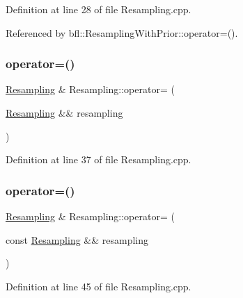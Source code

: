 Definition at line 28 of file Resampling.\+cpp.



Referenced by bfl\+::\+Resampling\+With\+Prior\+::operator=().

\mbox{\label{classbfl_1_1Resampling_a2c90a9a0705770bad5761a04fefe6eaa}} 
\subsubsection{\texorpdfstring{operator=()}{operator=()}\hspace{0.1cm}{\footnotesize\ttfamily [2/3]}}
{\footnotesize\ttfamily \mbox{\hyperlink{classbfl_1_1Resampling}{Resampling}} \& Resampling\+::operator= (\begin{DoxyParamCaption}\item[{\mbox{\hyperlink{classbfl_1_1Resampling}{Resampling}} \&\&}]{resampling }\end{DoxyParamCaption})\hspace{0.3cm}{\ttfamily [noexcept]}}



Definition at line 37 of file Resampling.\+cpp.

\mbox{\label{classbfl_1_1Resampling_a2120e8c5d26276cd3432ac23a2ada859}} 
\subsubsection{\texorpdfstring{operator=()}{operator=()}\hspace{0.1cm}{\footnotesize\ttfamily [3/3]}}
{\footnotesize\ttfamily \mbox{\hyperlink{classbfl_1_1Resampling}{Resampling}} \& Resampling\+::operator= (\begin{DoxyParamCaption}\item[{const \mbox{\hyperlink{classbfl_1_1Resampling}{Resampling}} \&\&}]{resampling }\end{DoxyParamCaption})\hspace{0.3cm}{\ttfamily [noexcept]}}



Definition at line 45 of file Resampling.\+cpp.


